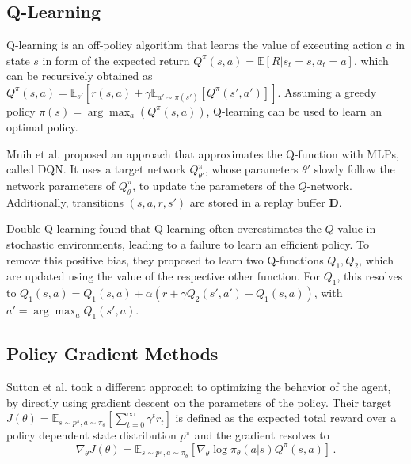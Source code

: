 \documentclass{article}
\newcommand{\set}[1]{\boldsymbol{#1}}
\newcommand{\policy}{\pi}
\newcommand{\expectation}{\mathbb{E}}
\newcommand{\param}{\theta}
\newcommand{\objective}{J}
\newcommand{\reward}{r}
\newcommand{\action}{a}
\newcommand{\state}{s}
\newcommand{\replayBuffer}{\set{D}}
\newcommand{\decay}{\gamma}
\begin{document}
\subsection{Q-Learning}
Q-learning \cite{Sutton1998reinforcement} is an off-policy algorithm that learns the value of executing action $\action$ in state $\state$ in form of the expected return $Q^\policy(\state,\action) = \expectation[R|\state_t=\state,\action_t=\action]$, which can be recursively obtained as $Q^\policy(\state,\action) = \expectation_{\state'}[r(\state,\action) + \gamma \expectation_{\action'\sim\policy(\state')}[Q^\policy(\state',\action')]]$.
Assuming a greedy policy $\policy(\state) = \arg\max_\action(Q^\policy(\state,\action))$, Q-learning can be used to learn an optimal policy.


Mnih et al. \cite{Mnih2015} proposed an approach that approximates the Q-function with \glspl*{MLP}, called \gls*{DQN}. It uses a target network $Q^\policy_{\param'}$, whose parameters $\param'$ slowly follow the network parameters of $Q^\policy_{\param}$, to update the parameters of the $Q$-network.
Additionally, transitions $(\state,\action,\reward,\state')$ are stored in a replay buffer $\replayBuffer$.

Double Q-learning \cite{VanHasselt2010} found that Q-learning often overestimates the $Q$-value in stochastic environments, leading to a failure to learn an efficient policy.
To remove this positive bias, they proposed to learn two Q-functions $Q_1,Q_2$, which are updated using the value of the respective other function. For $Q_1$, this resolves to $Q_1(\state,\action) = Q_1(\state,\action) + \alpha(\reward + \gamma Q_2(\state',\action') - Q_1(\state,\action))$, with $\action' = \arg\max_\action Q_1(\state',\action)$. 

\subsection{Policy Gradient Methods}

Sutton et al. \cite{Sutton1999Gradient} took a different approach to optimizing the behavior of the agent, by directly using gradient descent on the parameters of the policy.
Their target $\objective(\param) = \expectation_{\state\sim p^\policy,\action\sim\policy_\param}[\sum_{t=0}^{\infty}\decay^t\reward_t]$ is defined as the expected total reward over a policy dependent state distribution $p^\policy$ and the gradient resolves to
\begin{equation}
\nabla_\param\objective(\param) = \expectation_{s\sim p^\policy,a\sim\policy_\param}\left[\nabla_\param\log\policy_\param(\action|\state)Q^\policy(\state,\action)\right]\,.
\label{eq:policyGradient}
\end{equation}
\end{document}
